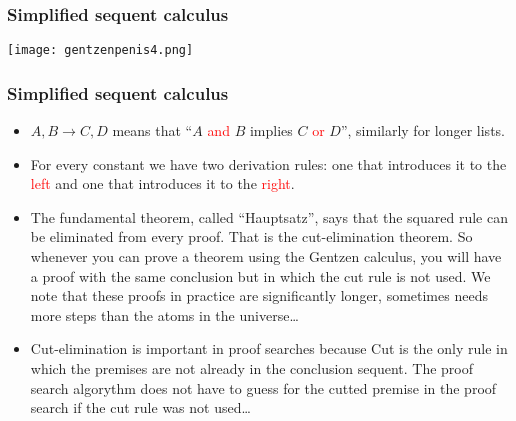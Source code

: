 \documentclass[xcolor=x11names]{beamer}
\newcommand{\cemph}[1]{\textcolor{red}{#1}}
\begin{document}
\begin{frame}
  \frametitle{Simplified sequent calculus}

  \texttt{[image: gentzenpenis4.png]}
\end{frame}

\begin{frame}
  \frametitle{Simplified sequent calculus}
  \begin{itemize}
    \item $A,B\to C,D$ means that ``$A$ \cemph{and} $B$ implies $C$ \cemph{or} $D$'', similarly for longer lists.
    \item For every constant we have two derivation rules: one that introduces it to the \cemph{left} and one that introduces it to the \cemph{right}.
    \item The fundamental theorem, called ``Hauptsatz'', says that the squared rule can be eliminated from every proof. That is the cut-elimination theorem. So whenever you can prove a theorem using the Gentzen calculus, you will have a proof with the same conclusion but in which the cut rule is not used. We note that these proofs in practice are significantly longer, sometimes needs more steps than the atoms in the universe\dots
    \item Cut-elimination is important in proof searches because Cut is the only rule in which the premises are not already in the conclusion sequent. The proof search algorythm does not have to guess for the cutted premise in the proof search if the cut rule was not used\dots
  \end{itemize}
\end{frame}
\end{document}
